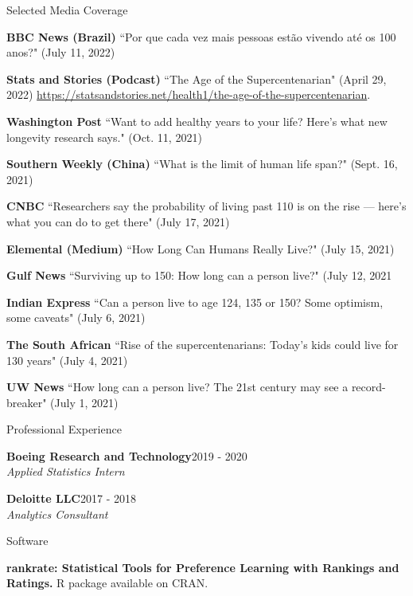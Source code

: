 \documentclass{resume} %
\begin{document}
\newpage

\begin{rSection}{Selected Media Coverage}

\small{

{\bf BBC News (Brazil)} ``Por que cada vez mais pessoas est\~{a}o vivendo at\'{e} os 100 anos?" (July 11, 2022)

{\bf Stats and Stories (Podcast)} ``The Age of the Supercentenarian" (April 29, 2022) \url{https://statsandstories.net/health1/the-age-of-the-supercentenarian}.

{\bf Washington Post} ``Want to add healthy years to your life? Here’s what new longevity research says." (Oct. 11, 2021)

{\bf Southern Weekly (China)} ``What is the limit of human life span?" (Sept. 16, 2021)

{\bf CNBC} ``Researchers say the probability of living past 110 is on the rise — here’s what you can do to get there" (July 17, 2021)

{\bf Elemental (Medium)} ``How Long Can Humans Really Live?" (July 15, 2021)

{\bf Gulf News} ``Surviving up to 150: How long can a person live?" (July 12, 2021

{\bf Indian Express} ``Can a person live to age 124, 135 or 150? Some optimism, some caveats" (July 6, 2021)

{\bf The South African} ``Rise of the supercentenarians: Today’s kids could live for 130 years" (July 4, 2021)

{\bf UW News} ``How long can a person live? The 21st century may see a record-breaker" (July 1, 2021)
}

\end{rSection}



\begin{rSection}{Professional Experience}

{\bf Boeing Research and Technology}\hfill{2019 - 2020}
\\{\it Applied Statistics Intern}

{\bf Deloitte LLC}\hfill{2017 - 2018}
\\{\it Analytics Consultant}

\end{rSection}

\begin{rSection}{Software}

{\bf rankrate: Statistical Tools for Preference Learning with Rankings and Ratings.} R package available on CRAN.

\end{rSection}
\end{document}
